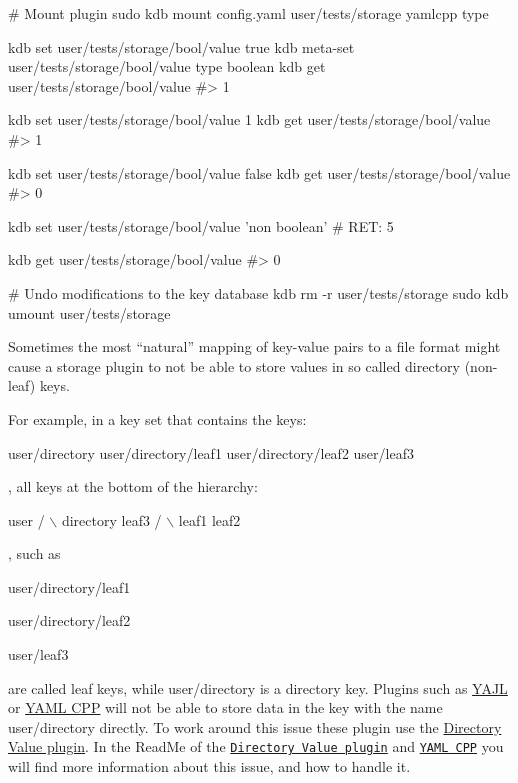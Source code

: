 \begin{DoxyCode}
# Mount plugin
sudo kdb mount config.yaml user/tests/storage yamlcpp type

kdb set user/tests/storage/bool/value true
kdb meta-set user/tests/storage/bool/value type boolean
kdb get user/tests/storage/bool/value
#> 1

kdb set user/tests/storage/bool/value 1
kdb get user/tests/storage/bool/value
#> 1

kdb set user/tests/storage/bool/value false
kdb get user/tests/storage/bool/value
#> 0

kdb set user/tests/storage/bool/value 'non boolean'
# RET: 5

kdb get user/tests/storage/bool/value
#> 0

# Undo modifications to the key database
kdb rm -r user/tests/storage
sudo kdb umount user/tests/storage
\end{DoxyCode}


Sometimes the most “natural” mapping of key-\/value pairs to a file format might cause a storage plugin to not be able to store values in so called directory (non-\/leaf) keys.

For example, in a key set that contains the keys\+:


\begin{DoxyCode}
user/directory
user/directory/leaf1
user/directory/leaf2
user/leaf3
\end{DoxyCode}


, all keys at the bottom of the hierarchy\+:


\begin{DoxyCode}
        user
      /      \(\backslash\)
  directory  leaf3
   /     \(\backslash\)
leaf1   leaf2
\end{DoxyCode}


, such as


\begin{DoxyItemize}
\item {\ttfamily user/directory/leaf1}
\item {\ttfamily user/directory/leaf2}
\item {\ttfamily user/leaf3}
\end{DoxyItemize}

are called leaf keys, while {\ttfamily user/directory} is a directory key. Plugins such as \hyperlink{autotoc_md835_src_plugins_yajl_README_md}{Y\+A\+JL} or \hyperlink{autotoc_md865_src_plugins_yamlcpp_README_md}{Y\+A\+ML C\+PP} will not be able to store data in the key with the name {\ttfamily user/directory} directly. To work around this issue these plugin use the \hyperlink{autotoc_md172_src_plugins_directoryvalue_README_md}{Directory Value plugin}. In the Read\+Me of the \href{https://www.libelektra.org/plugins/directoryvalue}{\tt Directory Value plugin} and \href{https://www.libelektra.org/plugins/yamlcpp}{\tt Y\+A\+ML C\+PP} you will find more information about this issue, and how to handle it.

